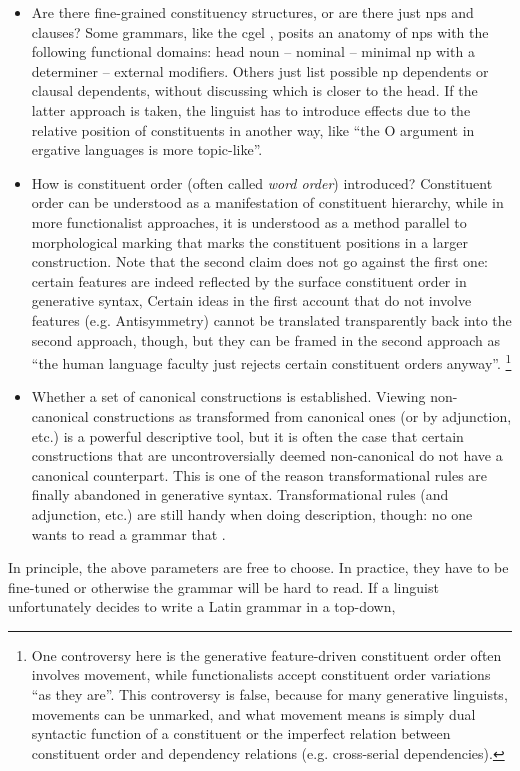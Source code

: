 \documentclass{article}
\newcommand*{\term}[1]{\emph{#1}}
\begin{document}
\begin{itemize}
    \item Are there fine-grained constituency structures, or are there just \acl{np}s and clauses?
    Some grammars, like the \ac{cgel} \citep{cgel}, 
    posits an anatomy of \ac{np}s with the following functional domains:
    head noun -- nominal -- minimal \ac{np} with a determiner -- external modifiers.
    Others just list possible \ac{np} dependents or clausal dependents,
    without discussing which is closer to the head. 
    If the latter approach is taken,
    the linguist has to introduce effects due to the relative position of constituents in another way,
    like ``the O argument in ergative languages is more topic-like''.
    
    \item How is constituent order (often called \term{word order}) introduced?
    Constituent order can be understood as a manifestation of constituent hierarchy,
    while in more functionalist approaches, 
    it is understood as a method parallel to morphological marking that 
    marks the constituent positions in a larger construction.
    Note that the second claim does not go against the first one:
    certain features are indeed reflected by the surface constituent order in generative syntax,
    Certain ideas in the first account that do not involve features (e.g. Antisymmetry)
    cannot be translated transparently back into the second approach, though,
    but they can be framed in the second approach as 
    ``the human language faculty just rejects certain constituent orders anyway''.%
    \footnote{
        One controversy here is the generative feature-driven constituent order often involves movement,
        while functionalists accept constituent order variations ``as they are''.
        This controversy is false, because for many generative linguists, 
        movements can be unmarked, and what movement means is simply 
        dual syntactic function of a constituent 
        or the imperfect relation between constituent order and dependency relations
        (e.g. cross-serial dependencies).
    }
    
    \item Whether a set of canonical constructions is established.
    Viewing non-canonical constructions as transformed from canonical ones (or by adjunction, etc.) 
    is a powerful descriptive tool,
    but it is often the case that certain constructions 
    that are uncontroversially deemed non-canonical do not have a canonical counterpart.
    This is one of the reason transformational rules are finally abandoned in generative syntax.
    Transformational rules (and adjunction, etc.) are still handy when doing description, though:
    no one wants to read a grammar that . %
\end{itemize}

In principle, the above parameters are free to choose.
In practice, they have to be fine-tuned or otherwise the grammar will be hard to read.
If a linguist unfortunately decides to write a Latin grammar 
in a top-down, 



\end{document}
